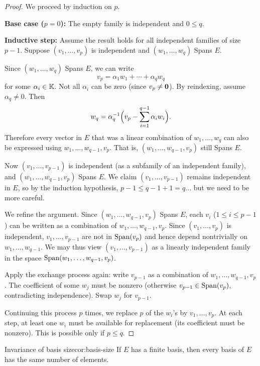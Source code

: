 \begin{proof}
We proceed by induction on $p$.

\textbf{Base case ($p=0$):} The empty family is independent and $0\leq q$.

\textbf{Inductive step:} Assume the result holds for all independent
families of size $p-1$. Suppose $(v_1,\ldots,v_p)$ is independent and
$(w_1,\ldots,w_q)$ Spans $E$.

Since $(w_1,\ldots,w_q)$ Spans $E$, we can write
\[
  v_p = \alpha_1 w_1 + \cdots + \alpha_q w_q
\]
for some $\alpha_i\in{\mathbb{K}}$. Not all $\alpha_i$ can be zero (since
$v_p\neq\mathbf{0}$). By reindexing, assume $\alpha_q\neq 0$. Then
\[
  w_q = \alpha_q^{-1}\Bigl(v_p - \sum_{i=1}^{q-1}\alpha_i w_i\Bigr).
\]
Therefore every vector in $E$ that was a linear combination of
$w_1,\ldots,w_q$ can also be expressed using $w_1,\ldots,w_{q-1},v_p$.
That is, $(w_1,\ldots,w_{q-1},v_p)$ still Spans $E$.

Now $(v_1,\ldots,v_{p-1})$ is independent (as a subfamily of an
independent family), and $(w_1,\ldots,w_{q-1},v_p)$ Spans $E$. We claim
$(v_1,\ldots,v_{p-1})$ remains independent in $E$, so by the induction
hypothesis, $p-1\leq q-1+1 = q$... but we need to be more careful.

We refine the argument. Since $(w_1,\ldots,w_{q-1},v_p)$ Spans $E$,
each $v_i$ ($1\leq i\leq p-1$) can be written as a combination of
$w_1,\ldots,w_{q-1},v_p$. Since $(v_1,\ldots,v_p)$ is independent,
$v_1,\ldots,v_{p-1}$ are not in $\operatorname{Span}(v_p)$ and hence depend
nontrivially on $w_1,\ldots,w_{q-1}$. We may thus view
$(v_1,\ldots,v_{p-1})$ as a linearly independent family in the space
$\operatorname{Span}(w_1,\ldots,w_{q-1},v_p)$.

Apply the exchange process again: write $v_{p-1}$ as a combination of
$w_1,\ldots,w_{q-1},v_p$. The coefficient of some $w_j$ must be nonzero
(otherwise $v_{p-1}\in\operatorname{Span}(v_p)$, contradicting independence). Swap
$w_j$ for $v_{p-1}$.

Continuing this process $p$ times, we replace $p$ of the $w_i$'s by
$v_1,\ldots,v_p$. At each step, at least one $w_i$ must be available
for replacement (its coefficient must be nonzero). This is possible only
if $p\leq q$.
\end{proof}

\begin{corollary}{Invariance of basis size}{cor:basis-size}
If $E$ has a finite basis, then every basis of $E$ has the same number of
elements.
\end{corollary}

